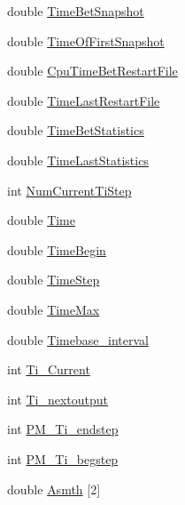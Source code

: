 \begin{DoxyCompactItemize}
\item 
double \hyperlink{structglobal__data__all__processes_a0c02c06bb5214dcf72dd4eb757df8ad3}{TimeBetSnapshot}
\item 
double \hyperlink{structglobal__data__all__processes_a18e4063fbc1f92e8c59d6e59c7b20631}{TimeOfFirstSnapshot}
\item 
double \hyperlink{structglobal__data__all__processes_af087b459cc41cb6b81bdbdd0e339cb6f}{CpuTimeBetRestartFile}
\item 
double \hyperlink{structglobal__data__all__processes_a1042ebf3c648c2b23dca6fc65ff22785}{TimeLastRestartFile}
\item 
double \hyperlink{structglobal__data__all__processes_a516be9ff5c4fd4171aa8e1a687e1e72d}{TimeBetStatistics}
\item 
double \hyperlink{structglobal__data__all__processes_ab088f20e7889a88f2e0f652df4781e44}{TimeLastStatistics}
\item 
int \hyperlink{structglobal__data__all__processes_a35de8a7666698b80478bfedf4362e844}{NumCurrentTiStep}
\item 
double \hyperlink{structglobal__data__all__processes_a25b9da73fdcbdc45fbe4a6ad45479f09}{Time}
\item 
double \hyperlink{structglobal__data__all__processes_ad671e0af15abea094631b996dc78c8f1}{TimeBegin}
\item 
double \hyperlink{structglobal__data__all__processes_a05a40a90ec77ac379054f82acbec87dc}{TimeStep}
\item 
double \hyperlink{structglobal__data__all__processes_a3e22fbc2ce177c1e383e9acbbf44f8d5}{TimeMax}
\item 
double \hyperlink{structglobal__data__all__processes_a0dd4962a455bb955f04ec271d7af7bb4}{Timebase\_\-interval}
\item 
int \hyperlink{structglobal__data__all__processes_ab0720db6b598f7295ec843708a1d3c6f}{Ti\_\-Current}
\item 
int \hyperlink{structglobal__data__all__processes_af1655016614a8c7ae59520abae300f67}{Ti\_\-nextoutput}
\item 
int \hyperlink{structglobal__data__all__processes_a723a0aa2f2ac0ac4cc58ebc049dda9b3}{PM\_\-Ti\_\-endstep}
\item 
int \hyperlink{structglobal__data__all__processes_a53412b692a49924318748259987031aa}{PM\_\-Ti\_\-begstep}
\item 
double \hyperlink{structglobal__data__all__processes_a3bf3f2dd9be45f8f203424e57b9d9de3}{Asmth} \mbox{[}2\mbox{]}
\item 

\end{DoxyCompactItemize}
